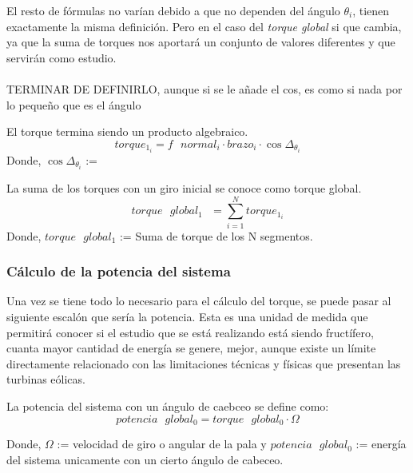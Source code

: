 El resto de fórmulas no varían debido a que no dependen del ángulo $\theta_i$, tienen exactamente la misma definición. Pero en el caso del \textit{torque global} si que cambia, ya que la suma de torques nos aportará un conjunto de valores diferentes y que servirán como estudio. \\\\


{\Large TERMINAR DE DEFINIRLO, aunque si se le añade el cos, es como si nada por lo pequeño que es el ángulo}
  \begin{definicion}
  El torque termina siendo un producto algebraico.
 $$ torque_1_{i} = f \text{ } normal_i \cdot brazo_i \cdot \cos{\Delta_{\theta_{i}}}$$
 Donde,
 \centering $\cos{\Delta_{\theta_{i}}}$ := 
 \label{def:torque_algebraico_torsion}
 \end{definicion}
 

\begin{definicion}
 La suma de los torques con un giro inicial se conoce como torque global.
 $$ torque \text{ } global_1 \text{ } = \sum_{i=1}^{N} torque_1_{i} $$
Donde,
\centering $torque \text{ } global_1$ := Suma de torque de los N segmentos.
 \label{def:torque_global_1}
\end{definicion}






















\subsubsection{Cálculo de la potencia del sistema}
\label{section:pot_sistema}
 
 Una vez se tiene todo lo necesario para el cálculo del torque, se puede pasar al siguiente escalón que sería la potencia. Esta es una unidad de medida que permitirá conocer si el estudio que se está realizando está siendo fructífero, cuanta mayor cantidad de energía se genere, mejor, aunque existe un límite directamente relacionado con las limitaciones técnicas y físicas que presentan las turbinas eólicas.
 
  \begin{definicion}
 La potencia del sistema con un ángulo de caebceo se define como:
 $$ potencia \text{ } global_0 = torque \text{ } global_0 \cdot \Omega $$ 
 
 Donde,
  \centering $\Omega$ := velocidad de giro o angular de la pala y $potencia \text{ } global_0$ := energía del sistema unicamente con un cierto ángulo de cabeceo.
 \label{def:potencia_giro_inicial}
 \end{definicion}
 
